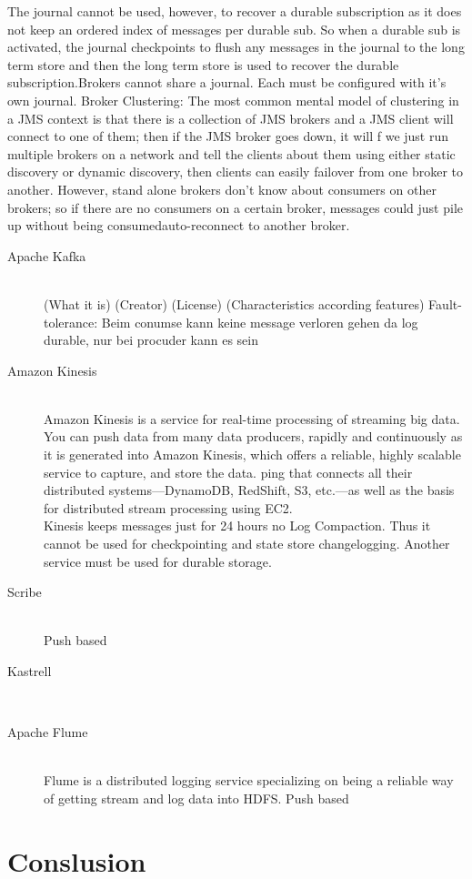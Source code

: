 \begin{description}
{    The journal cannot be used, however, to recover a durable subscription as it
    does not keep an ordered index of messages per durable sub. So when a durable
    sub is activated, the journal checkpoints to flush any messages in the journal
    to the long term store and then the long term store is used to recover the
    durable subscription.Brokers cannot share a journal. Each must be
configured with it's own journal. Broker Clustering: The most common mental model of clustering in
a JMS context is that there is a collection of JMS brokers and a JMS client
will connect to one of them; then if the JMS broker goes down, it will
f we just run multiple brokers on a network and tell the clients about them
using either static discovery or dynamic discovery, then clients can easily
failover from one broker to another. However, stand alone brokers don't know
about consumers on other brokers; so if there are no consumers on a certain
broker, messages could just pile up without being consumedauto-reconnect to
another broker. } 

\end{description}


\begin{description}
    \item [Apache Kafka] \hfill \\
        { (What it is) (Creator) (License) (Characteristics according features) Fault-tolerance: Beim conumse kann keine message verloren gehen da log durable, nur bei procuder kann es sein }
    \item [Amazon Kinesis] \hfill \\
    { Amazon Kinesis is a service for real-time processing of streaming big
    data. You can push data from many data producers, rapidly and continuously
as it is generated into Amazon Kinesis, which offers a reliable, highly
scalable service to capture, and store the data. ping that connects all their
distributed systems—DynamoDB, RedShift, S3, etc.—as well as the basis for
distributed stream processing using EC2. \\
 Kinesis keeps messages just for 24 hours no Log Compaction. Thus it cannot be
 used for checkpointing and state store changelogging. Another service must be
 used for durable storage.\\
    
 }
    \item [Scribe] \hfill \\
    { Push based}
    \item [Kastrell] \hfill \\
    {}
    \item [Apache Flume] \hfill \\
    {Flume is a distributed logging service specializing on being a reliable way
    of getting stream and log data into HDFS. Push based}
\end{description}

\section{Conslusion}

